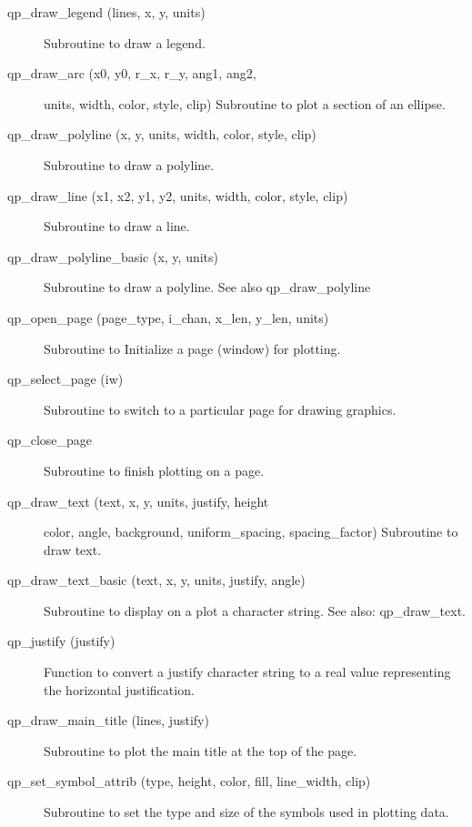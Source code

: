 \begin{description}
\item[qp\_draw\_legend (lines, x, y, units)] \Newline 
     Subroutine to draw a legend.

\item[qp\_draw\_arc (x0, y0, r\_x, r\_y, ang1, ang2, ] \Newline 
                             units, width, color, style, clip)
     Subroutine to plot a section of an ellipse.

\item[qp\_draw\_polyline (x, y, units, width, color, style, clip)] \Newline 
     Subroutine to draw a polyline.

\item[qp\_draw\_line (x1, x2, y1, y2, units, width, color, style, clip)] \Newline 
     Subroutine to draw a line.

\item[qp\_draw\_polyline\_basic (x, y, units) ] \Newline 
     Subroutine to draw a polyline. See also qp\_draw\_polyline

\item[qp\_open\_page (page\_type, i\_chan, x\_len, y\_len, units)] \Newline 
     Subroutine to Initialize a page (window) for plotting.

\item[qp\_select\_page (iw)] \Newline 
     Subroutine to switch to a particular page for drawing graphics.

\item[qp\_close\_page] \Newline 
     Subroutine to finish plotting on a page.

\item[qp\_draw\_text (text, x, y, units, justify, height ] \Newline 
        color, angle, background, uniform\_spacing, spacing\_factor)
     Subroutine to draw text.

\item[qp\_draw\_text\_basic (text, x, y, units, justify, angle)] \Newline 
     Subroutine to display on a plot a character string.
     See also: qp\_draw\_text.

\item[qp\_justify (justify)] \Newline 
     Function to convert a justify character string to a real value
     representing the horizontal justification. 

\item[qp\_draw\_main\_title (lines, justify)] \Newline 
     Subroutine to plot the main title at the top of the page.

\item[qp\_set\_symbol\_attrib (type, height, color, fill, line\_width, clip)] \Newline 
     Subroutine to set the type and size of the symbols used in plotting data.


\end{description}
